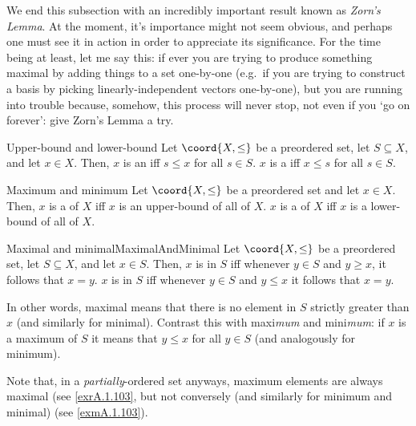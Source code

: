We end this subsection with an incredibly important result known as \emph{Zorn's Lemma}.  At the moment, it's importance might not seem obvious, and perhaps one must see it in action in order to appreciate its significance.  For the time being at least, let me say this:  if ever you are trying to produce something maximal by adding things to a set one-by-one (e.g.~if you are trying to construct a basis by picking linearly-independent vectors one-by-one), but you are running into trouble because, somehow, this process will never stop, not even if you `go on forever':  give Zorn's Lemma a try.
\begin{dfn}{Upper-bound and lower-bound}{}
Let $\coord{X,\leq}$ be a preordered set, let $S\subseteq X$, and let $x\in X$.  Then, $x$ is an  iff $s\leq x$ for all $s\in S$.  $x$ is a  iff $x\leq s$ for all $s\in S$.
\end{dfn}
\begin{dfn}{Maximum and minimum}{}
Let $\coord{X,\leq}$ be a preordered set and let $x\in X$.  Then, $x$ is a  of $X$ iff $x$ is an upper-bound of all of $X$.  $x$ is a  of $X$ iff $x$ is a lower-bound of all of $X$.
\end{dfn}
\begin{dfn}{Maximal and minimal}{MaximalAndMinimal}
Let $\coord{X,\leq}$ be a preordered set, let $S\subseteq X$, and let $x\in S$.  Then, $x$ is  in $S$ iff whenever $y\in S$ and $y\geq x$, it follows that $x=y$.  $x$ is  in $S$ iff whenever $y\in S$ and $y\leq x$ it follows that $x=y$.
\begin{rmk}
In other words, maximal means that there is no element in $S$ strictly greater than $x$ (and similarly for minimal).  Contrast this with maxi\emph{mum} and mini\emph{mum}:  if $x$ is a maximum of $S$ it means that $y\leq x$ for all $y\in S$ (and analogously for minimum).
\end{rmk}
\begin{rmk}
Note that, in a \emph{partially}-ordered set anyways, maximum elements are always maximal (see \cref{exrA.1.103}, but not conversely (and similarly for minimum and minimal) (see \cref{exmA.1.103}).
\end{rmk}
\end{dfn}
